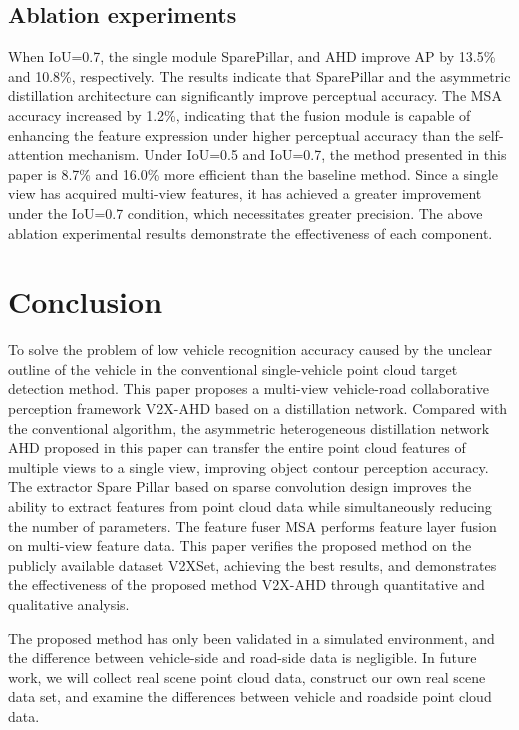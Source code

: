\documentclass[lettersize,journal]{IEEEtran}
\begin{document}
\subsection{Ablation experiments}
When IoU=0.7, the single module SparePillar, and AHD improve AP by 13.5\% and 10.8\%, respectively. The results indicate that SparePillar and the asymmetric distillation architecture can significantly improve perceptual accuracy. The MSA accuracy increased by 1.2\%, indicating that the fusion module is capable of enhancing the feature expression under higher perceptual accuracy than the self-attention mechanism. Under IoU=0.5 and IoU=0.7, the method presented in this paper is 8.7\% and 16.0\% more efficient than the baseline method. Since a single view has acquired multi-view features, it has achieved a greater improvement under the IoU=0.7 condition, which necessitates greater precision. The above ablation experimental results demonstrate the effectiveness of each component.



\section{Conclusion}
To solve the problem of low vehicle recognition accuracy caused by the unclear outline of the vehicle in the conventional single-vehicle point cloud target detection method. This paper proposes a multi-view vehicle-road collaborative perception framework V2X-AHD based on a distillation network. Compared with the conventional algorithm, the asymmetric heterogeneous distillation network AHD proposed in this paper can transfer the entire point cloud features of multiple views to a single view, improving object contour perception accuracy. The extractor Spare Pillar based on sparse convolution design improves the ability to extract features from point cloud data while simultaneously reducing the number of parameters. The feature fuser MSA performs feature layer fusion on multi-view feature data. This paper verifies the proposed method on the publicly available dataset V2XSet, achieving the best results, and demonstrates the effectiveness of the proposed method V2X-AHD through quantitative and qualitative analysis.

The proposed method has only been validated in a simulated environment, and the difference between vehicle-side and road-side data is negligible. In future work, we will collect real scene point cloud data, construct our own real scene data set, and examine the differences between vehicle and roadside point cloud data.
\end{document}
